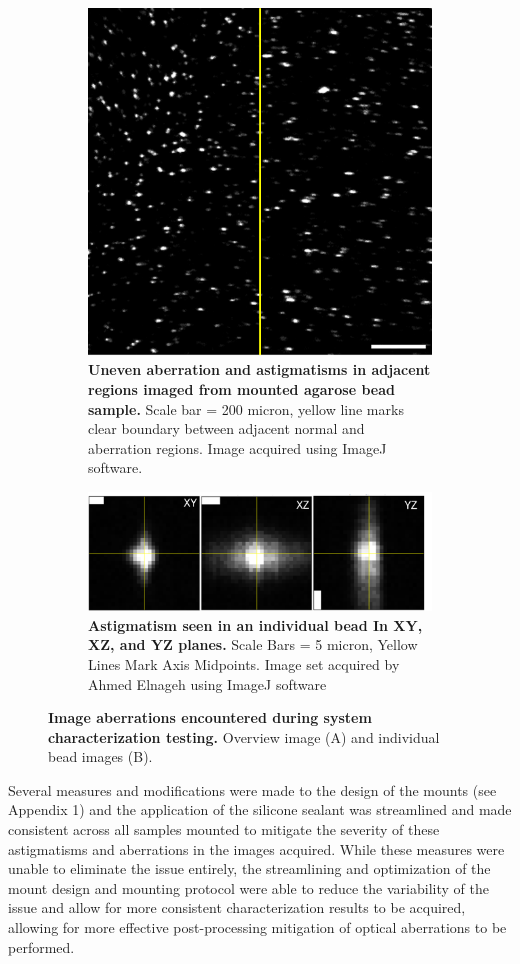 \begin{figure}[H]
    \centering
    \begin{subfigure}[t]{0.75\textwidth}
        \centering
        \includegraphics[width=0.6\linewidth]{Images/astigma2.png}
        \caption{\textbf{Uneven aberration and astigmatisms in adjacent regions imaged from mounted agarose bead sample.} Scale bar = 200 micron, yellow line marks clear boundary between adjacent normal and aberration regions. Image acquired using ImageJ software.}
    \end{subfigure}
    \medskip
    
    \begin{subfigure}[t]{0.75\textwidth}
        \centering
        \includegraphics[width=0.8\linewidth]{Images/astigma1.png}
        \caption{\textbf{Astigmatism seen in an individual bead In XY, XZ, and YZ planes.} Scale Bars = 5 micron, Yellow Lines Mark Axis Midpoints. Image set acquired by Ahmed Elnageh using ImageJ software}
    \end{subfigure}
        
    \caption{\textbf{Image aberrations encountered during system characterization testing.} Overview image (A) and individual bead images (B).}
\end{figure}

Several measures and modifications were made to the design of the mounts (see Appendix 1) and the application of the silicone sealant was streamlined and made consistent across all samples mounted to mitigate the severity of these astigmatisms and aberrations in the images acquired. While these measures were unable to eliminate the issue entirely, the streamlining and optimization of the mount design and mounting protocol were able to reduce the variability of the issue and allow for more consistent characterization results to be acquired, allowing for more effective post-processing mitigation of optical aberrations to be performed. 

